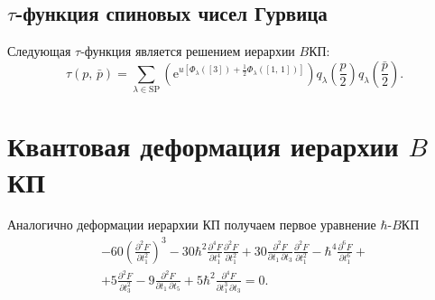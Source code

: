 \documentclass[a4paper,14pt]{extarticle}
\numberwithin{equation}{section}
\begin{document}
\subsection{$\tau$-функция спиновых чисел Гурвица}
Следующая $\tau$-функция является решением иерархии $B$КП:
\begin{equation}
	\tau \left( p,\,\bar{p} \right) =
	\sum_{\lambda \in \mathrm{SP}}^{} \left( \mathrm{e} ^{u \left[ 
	\Phi_\lambda\left( \left[ 3 \right]  \right) +\frac{1}{2}\Phi_\lambda \left( \left[ 1,\,1 \right]  \right) \right] } \right) q_\lambda\left(\frac{p}{2}\right)q_\lambda \left(\frac{\bar{p}}{2}\right)
	\label{}
.\end{equation}

\section{Квантовая деформация иерархии $B$КП}
Аналогично деформации иерархии КП получаем первое уравнение $\hbar $-$B$КП
\begin{multline}
-60 \left(\frac{\partial ^2F}{\partial
   t_1^2}\right)^3-30\hbar ^2 \frac{\partial ^4F}{\partial
   t_1^4} \frac{\partial ^2F}{\partial
   t_1^2}+30 \frac{\partial ^2F}{\partial t_1\, \partial t_3}
   \frac{\partial ^2F}{\partial t_1^2}-\hbar ^4\frac{\partial
   ^6F}{\partial t_1^6}+\\+5 \frac{\partial ^2F}{\partial
   t_3^2}-9 \frac{\partial ^2F}{\partial t_1\, \partial t_5}+5
   \hbar ^2\frac{\partial ^4F}{\partial t_1^3\, \partial t_3}=0	
	\label{}
.\end{multline}
\end{document}
